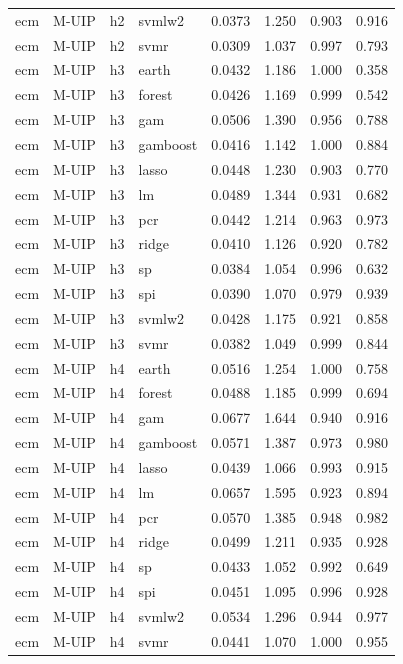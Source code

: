 \begin{ThreePartTable}
\begin{longtable}[t]{llclcccc}
ecm & M-UIP & h2 & svmlw2 & 0.0373 & 1.250 & 0.903 & 0.916\\
ecm & M-UIP & h2 & svmr & 0.0309 & 1.037 & 0.997 & 0.793\\
\addlinespace
ecm & M-UIP & h3 & earth & 0.0432 & 1.186 & 1.000 & 0.358\\
ecm & M-UIP & h3 & forest & 0.0426 & 1.169 & 0.999 & 0.542\\
ecm & M-UIP & h3 & gam & 0.0506 & 1.390 & 0.956 & 0.788\\
ecm & M-UIP & h3 & gamboost & 0.0416 & 1.142 & 1.000 & 0.884\\
ecm & M-UIP & h3 & lasso & 0.0448 & 1.230 & 0.903 & 0.770\\
ecm & M-UIP & h3 & lm & 0.0489 & 1.344 & 0.931 & 0.682\\
ecm & M-UIP & h3 & pcr & 0.0442 & 1.214 & 0.963 & 0.973\\
ecm & M-UIP & h3 & ridge & 0.0410 & 1.126 & 0.920 & 0.782\\
ecm & M-UIP & h3 & sp & 0.0384 & 1.054 & 0.996 & 0.632\\
ecm & M-UIP & h3 & spi & 0.0390 & 1.070 & 0.979 & 0.939\\
ecm & M-UIP & h3 & svmlw2 & 0.0428 & 1.175 & 0.921 & 0.858\\
ecm & M-UIP & h3 & svmr & 0.0382 & 1.049 & 0.999 & 0.844\\
\addlinespace
ecm & M-UIP & h4 & earth & 0.0516 & 1.254 & 1.000 & 0.758\\
ecm & M-UIP & h4 & forest & 0.0488 & 1.185 & 0.999 & 0.694\\
ecm & M-UIP & h4 & gam & 0.0677 & 1.644 & 0.940 & 0.916\\
ecm & M-UIP & h4 & gamboost & 0.0571 & 1.387 & 0.973 & 0.980\\
ecm & M-UIP & h4 & lasso & 0.0439 & 1.066 & 0.993 & 0.915\\
ecm & M-UIP & h4 & lm & 0.0657 & 1.595 & 0.923 & 0.894\\
ecm & M-UIP & h4 & pcr & 0.0570 & 1.385 & 0.948 & 0.982\\
ecm & M-UIP & h4 & ridge & 0.0499 & 1.211 & 0.935 & 0.928\\
ecm & M-UIP & h4 & sp & 0.0433 & 1.052 & 0.992 & 0.649\\
ecm & M-UIP & h4 & spi & 0.0451 & 1.095 & 0.996 & 0.928\\
ecm & M-UIP & h4 & svmlw2 & 0.0534 & 1.296 & 0.944 & 0.977\\
ecm & M-UIP & h4 & svmr & 0.0441 & 1.070 & 1.000 & 0.955\\

\end{longtable}
\end{ThreePartTable}
